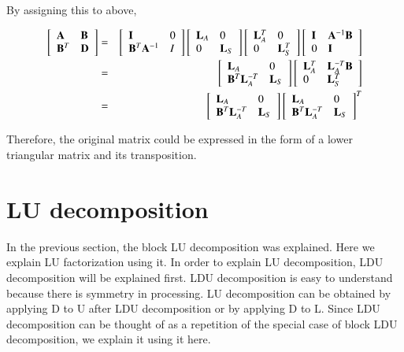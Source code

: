 By assigning this to above,

\begin{eqnarray}
\left[\begin{array}{ll}
\mathbf{A} & \mathbf{B}\\
\mathbf{B}^T & \mathbf{D}
\end{array}\right]
&=&
\left[\begin{array}{ll}
\mathbf{I} & 0\\
\mathbf{B}^T\mathbf{A}^{-1} & I
\end{array}\right]
\left[\begin{array}{ll}
\mathbf{L}_A & 0 \\
0 & \mathbf{L}_S
\end{array}\right]
\left[\begin{array}{ll}
\mathbf{L}_A^T & 0 \\
0 & \mathbf{L}_S^T\end{array}\right]
\left[\begin{array}{ll}
\mathbf{I} & \mathbf{A}^{-1}\mathbf{B}\\
0 & \mathbf{I}\end{array}\right]\\
&=&
\left[\begin{array}{ll}
\mathbf{L}_A & 0\\
\mathbf{B}^T\mathbf{L}_A^{-T} & \mathbf{L}_S
\end{array}\right]
\left[\begin{array}{ll}
\mathbf{L}_A^T & \mathbf{L}_A^{-T}\mathbf{B} \\
0 & \mathbf{L}_S^T
\end{array}\right]\\
&=&
\left[\begin{array}{ll}
\mathbf{L}_A & 0\\
\mathbf{B}^T\mathbf{L}_A^{-T} & \mathbf{L}_S
\end{array}\right]
\left[\begin{array}{ll}
\mathbf{L}_A & 0\\
\mathbf{B}^T\mathbf{L}_A^{-T} & \mathbf{L}_S
\end{array}\right]^T
\end{eqnarray}

Therefore, the original matrix could be expressed in the form of a lower triangular matrix and its transposition.

\section{LU decomposition}

In the previous section, the block LU decomposition was explained. 
%
Here we explain LU factorization using it. 
%
In order to explain LU decomposition, LDU decomposition will be explained first. LDU decomposition is easy to understand because there is symmetry in processing. 
%
LU decomposition can be obtained by applying D to U after LDU decomposition or by applying D to L. 
%
Since LDU decomposition can be thought of as a repetition of the special case of block LDU decomposition, we explain it using it here.


